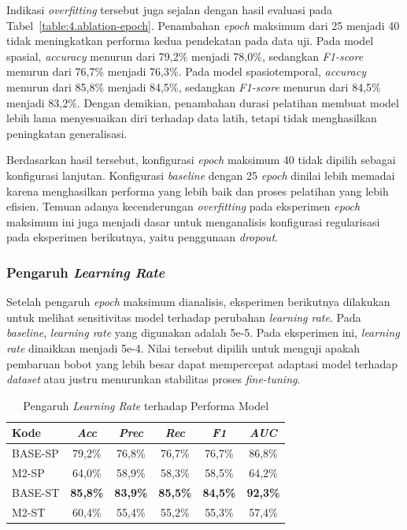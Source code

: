 Indikasi \textit{overfitting} tersebut juga sejalan dengan hasil evaluasi pada Tabel~\ref{table:4.ablation-epoch}. Penambahan \textit{epoch} maksimum dari 25 menjadi 40 tidak meningkatkan performa kedua pendekatan pada data uji. Pada model spasial, \textit{accuracy} menurun dari 79,2\% menjadi 78,0\%, sedangkan \textit{F1-score} menurun dari 76,7\% menjadi 76,3\%. Pada model spasiotemporal, \textit{accuracy} menurun dari 85,8\% menjadi 84,5\%, sedangkan \textit{F1-score} menurun dari 84,5\% menjadi 83,2\%. Dengan demikian, penambahan durasi pelatihan membuat model lebih lama menyesuaikan diri terhadap data latih, tetapi tidak menghasilkan peningkatan generalisasi.

Berdasarkan hasil tersebut, konfigurasi \textit{epoch} maksimum 40 tidak dipilih sebagai konfigurasi lanjutan. Konfigurasi \textit{baseline} dengan 25 \textit{epoch} dinilai lebih memadai karena menghasilkan performa yang lebih baik dan proses pelatihan yang lebih efisien. Temuan adanya kecenderungan \textit{overfitting} pada eksperimen \textit{epoch} maksimum ini juga menjadi dasar untuk menganalisis konfigurasi regularisasi pada eksperimen berikutnya, yaitu penggunaan \textit{dropout}.

\subsubsection{Pengaruh \textit{Learning Rate}} \label{IV.Eksperimen_Ablation_LR}
Setelah pengaruh \textit{epoch} maksimum dianalisis, eksperimen berikutnya dilakukan untuk melihat sensitivitas model terhadap perubahan \textit{learning rate}. Pada \textit{baseline}, \textit{learning rate} yang digunakan adalah 5e-5. Pada eksperimen ini, \textit{learning rate} dinaikkan menjadi 5e-4. Nilai tersebut dipilih untuk menguji apakah pembaruan bobot yang lebih besar dapat mempercepat adaptasi model terhadap \textit{dataset} atau justru menurunkan stabilitas proses \textit{fine-tuning}.

\begin{table}[htbp]
\centering
\caption{Pengaruh \textit{Learning Rate} terhadap Performa Model}
\label{table:4.ablation-lr}
\begin{tabular}{lccccc}
\toprule
\textbf{Kode} &
\textbf{\textit{Acc}} &
\textbf{\textit{Prec}} &
\textbf{\textit{Rec}} &
\textbf{\textit{F1}} &
\textbf{\textit{AUC}} \\
\midrule
BASE-SP & 79,2\% & 76,8\% & 76,7\% & 76,7\% & 86,8\% \\
M2-SP & 64,0\% & 58,9\% & 58,3\% & 58,5\% & 64,2\% \\
\midrule
BASE-ST & \textbf{85,8\%} & \textbf{83,9\%} & \textbf{85,5\%} & \textbf{84,5\%} & \textbf{92,3\%} \\
M2-ST & 60,4\% & 55,4\% & 55,2\% & 55,3\% & 57,4\% \\
\bottomrule
\end{tabular}
\end{table}

